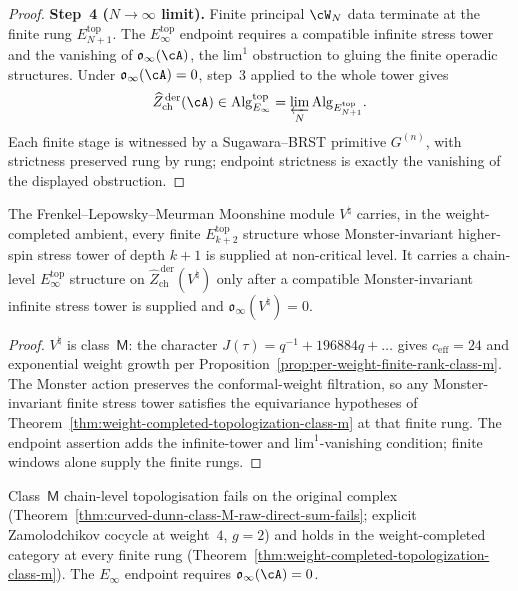 \begin{proof}
\smallskip\noindent
\textbf{Step~4 ($N \to \infty$ limit).}
Finite principal $\cW_N$ data terminate at the finite rung
$E_{N+1}^{\mathrm{top}}$. The $E_\infty^{\mathrm{top}}$ endpoint
requires a compatible infinite stress tower and the vanishing of
$\mathfrak{o}_{\infty}(\cA)$, the $\mathrm{lim}^1$ obstruction to
gluing the finite operadic structures. Under
$\mathfrak{o}_{\infty}(\cA) = 0$, step~3 applied to the whole tower
gives
\[
 \widehat{Z}^{\,\mathrm{der}}_{\mathrm{ch}}(\cA)
 \in
 \mathrm{Alg}_{E_\infty}^{\mathrm{top}}
 =
 \varprojlim_N\mathrm{Alg}_{E_{N+1}^{\mathrm{top}}}.
\]
Each finite stage is witnessed by a Sugawara--BRST primitive
$G^{(n)}$, with strictness preserved rung by rung; endpoint strictness
is exactly the vanishing of the displayed obstruction.
\end{proof}

\begin{corollary}
\label{cor:moonshine-chain-level-e-infinity-topological}
\ClaimStatusConditional
The Frenkel--Lepowsky--Meurman Moonshine module $V^{\natural}$
carries, in the weight-completed ambient, every finite
$E_{k+2}^{\mathrm{top}}$ structure whose Monster-invariant
higher-spin stress tower of depth $k+1$ is supplied at non-critical
level. It carries a chain-level $E_\infty^{\mathrm{top}}$ structure
on $\widehat{Z}^{\,\mathrm{der}}_{\mathrm{ch}}(V^{\natural})$ only
after a compatible Monster-invariant infinite stress tower is supplied
and
$\mathfrak{o}_{\infty}(V^{\natural})=0$.
\end{corollary}

\begin{proof}
$V^{\natural}$ is class~$\mathsf{M}$: the character $J(\tau) =
q^{-1} + 196884 q + \ldots$ gives $c_{\mathrm{eff}} = 24$ and
exponential weight growth per
Proposition~\ref{prop:per-weight-finite-rank-class-m}. The Monster
action preserves the conformal-weight filtration, so any
Monster-invariant finite stress tower satisfies the equivariance
hypotheses of
Theorem~\ref{thm:weight-completed-topologization-class-m} at that
finite rung. The endpoint assertion adds the infinite-tower and
$\mathrm{lim}^1$-vanishing condition; finite windows alone supply the
finite rungs.
\end{proof}

\begin{remark}
\label{rem:raw-failure-weight-completed-success}
Class~$\mathsf{M}$ chain-level topologisation fails on the original
complex
(Theorem~\ref{thm:curved-dunn-class-M-raw-direct-sum-fails}; explicit
Zamolodchikov cocycle at weight~$4$, $g=2$) and holds in the
weight-completed category at every finite rung
(Theorem~\ref{thm:weight-completed-topologization-class-m}). The
$E_\infty$ endpoint requires $\mathfrak{o}_{\infty}(\cA)=0$.
\end{remark}

